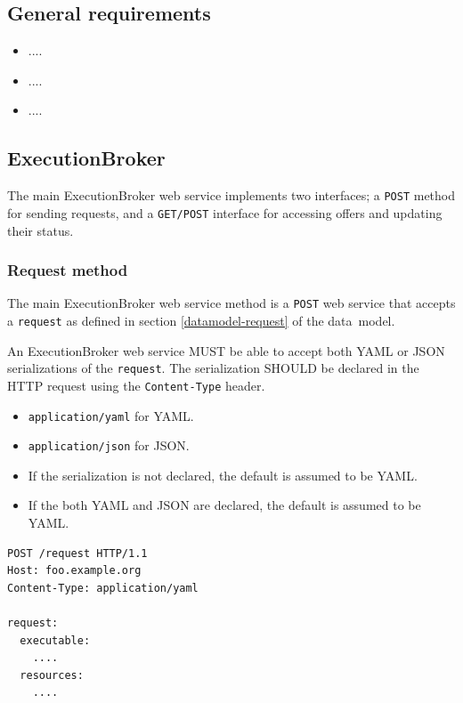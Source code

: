\documentclass[11pt,a4paper]{ivoa}
\newcommand{\json} {JSON}
\newcommand{\yaml} {YAML}
\newcommand{\datamodel} {data~model}
\newcommand{\webservice} {web service}
\newcommand{\execbrokerclass} {ExecutionBroker}
\newcommand{\codeword}[1] {\texttt{#1}}
\begin{document}
\subsection{General requirements}
\label{general-requirements}

\begin{itemize}
    \item ....
    \item ....
    \item ....
\end{itemize}

\subsection{ExecutionBroker}
\label{execution-planner-spec}

The main \execbrokerclass{} \webservice{} implements two interfaces;
a \codeword{POST} method for sending requests, and a \codeword{GET/POST}
interface for accessing offers and updating their status.

\subsubsection{Request method}
\label{execution-planner-request}

The main \execbrokerclass{} \webservice{} method is a \codeword{POST} \webservice{} that accepts
a \codeword{request} as defined in section \ref{datamodel-request} of the \datamodel{}.

An \execbrokerclass{} \webservice{} MUST be able to accept both \yaml{} or \json{} serializations
of the \codeword{request}.
The serialization SHOULD be declared in the HTTP request using the \codeword{Content-Type} header.
\begin{itemize}
    \item \codeword{application/yaml} for \yaml{}.
    \item \codeword{application/json} for \json{}.
    \item If the serialization is not declared, the default is assumed to be \yaml{}.
    \item If the both \yaml{} and \json{} are declared, the default is assumed to be \yaml{}.
\end{itemize}

\begin{lstlisting}[]
POST /request HTTP/1.1
Host: foo.example.org
Content-Type: application/yaml

request:
  executable:
    ....
  resources:
    ....
\end{lstlisting}
\end{document}
